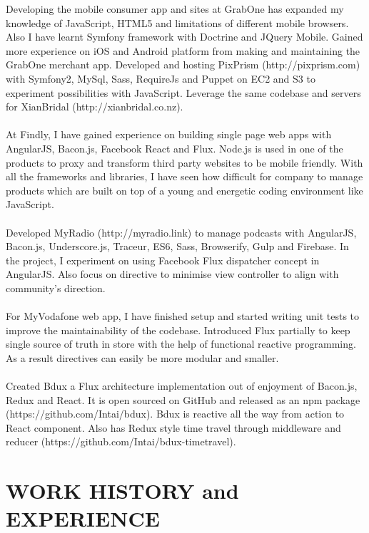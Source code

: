 \begin{resume}
Developing the mobile consumer app and sites at GrabOne has expanded my knowledge of JavaScript, HTML5 and limitations of different mobile browsers. Also I have learnt Symfony framework with Doctrine and JQuery Mobile. Gained more experience on iOS and Android platform from making and maintaining the GrabOne merchant app.
\newpage
Developed and hosting PixPrism (http://pixprism.com) with Symfony2, MySql, Sass, RequireJs and Puppet on EC2 and S3 to experiment possibilities with JavaScript. Leverage the same codebase and servers for XianBridal (http://xianbridal.co.nz).
\\\\
At Findly, I have gained experience on building single page web apps with AngularJS, Bacon.js, Facebook React and Flux. Node.js is used in one of the products to proxy and transform third party websites to be mobile friendly. With all the frameworks and libraries, I have seen how difficult for company to manage products which are built on top of a young and energetic coding environment like JavaScript.
\\\\
Developed MyRadio (http://myradio.link) to manage podcasts with AngularJS, Bacon.js, Underscore.js, Traceur, ES6, Sass, Browserify, Gulp and Firebase. In the project, I experiment on using Facebook Flux dispatcher concept in AngularJS. Also focus on directive to minimise view controller to align with community's direction.
\\\\
For MyVodafone web app, I have finished setup and started writing unit tests to improve the maintainability of the codebase. Introduced Flux partially to keep single source of truth in store with the help of functional reactive programming. As a result directives can easily be more modular and smaller.
\\\\
Created Bdux a Flux architecture implementation out of enjoyment of Bacon.js, Redux and React. It is open sourced on GitHub and released as an npm package (https://github.com/Intai/bdux). Bdux is reactive all the way from action to React component. Also has Redux style time travel through middleware and reducer (https://github.com/Intai/bdux-timetravel).

\section{WORK HISTORY and EXPERIENCE} 
\vspace{0.15in} 


\end{resume}
